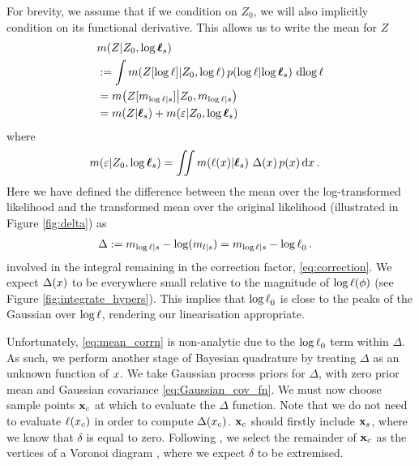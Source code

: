 \documentclass{article}
\begin{document}
For brevity, we assume that if we condition on $Z_0$, we will also implicitly condition on its functional derivative. This allows us to write the mean for  $Z$
%
\begin{align}
& \mean{\If}{Z_0,\tvr_s} \nonumber\\
& \deq \int \mean{Z[\tr]}{Z_0,\tr}
\p{\tr}{\tvr_s}\, \ud \tr 
\nonumber\\
& = \mean{Z[m_{\tr|s}]}{Z_0,m_{\tr|s}} \nonumber\\
& = \mean{\If}{\vr_s} + 
\mean{\varepsilon}{Z_0,\tvr_s}
\label{eq:mean_ev1}
\end{align}
where
\begin{align}\label{eq:mean_corrn}
\mean{\varepsilon}{Z_0,\tvr_s} 
& = \iint \mean{\lfn(\lfv)}{\vr_s}\,
\Delta(\lfv)\,\po{\lfv}\ud\lfv\,.
\end{align}
Here we have defined the difference between the \gpb mean over the log-transformed likelihood and the transformed \gpb mean over the original likelihood (illustrated in Figure \ref{fig:delta}) as
\begin{align}
\Delta & \deq m_{\tr |s} - \log(m_{l|s}) = m_{\tr |s}  - \tr_0 \,.
\end{align}
involved in the integral remaining in the correction factor, \eqref{eq:correction}.
We expect $\Delta(\lfv)$ to be everywhere small relative to the magnitude of $\tr(\phi)$ (see Figure \ref{fig:integrate_hypers}). This implies that
 $\tr_0$ is close to the peaks of the Gaussian over $\tr$, rendering our linearisation appropriate. 

Unfortunately, \eqref{eq:mean_corrn} is non-analytic due to the $\tr_0$ term within $\Delta$. As such, we perform another stage of Bayesian quadrature by treating $\Delta$ as an unknown function of $\lfv$. We take Gaussian process priors for $\Delta$, with zero prior mean and Gaussian covariance \eqref{eq:Gaussian_cov_fn}. We must now choose sample points $\vlfv_c$ at which to evaluate the $\Delta$ function. 
Note that we do not need to evaluate $\lfn(\lfv_c)$ in order to compute $\Delta(\lfv_c)$.
$\vlfv_c$ should firstly include $\vlfv_s$, where we know that $\delta$ is equal to zero. Following \citet{BQR}, we select the remainder of $\vlfv_c$  as the  vertices of a Voronoi diagram \citep{okabe1997locational}, where we expect $\delta$ to be extremised. 
\end{document}
